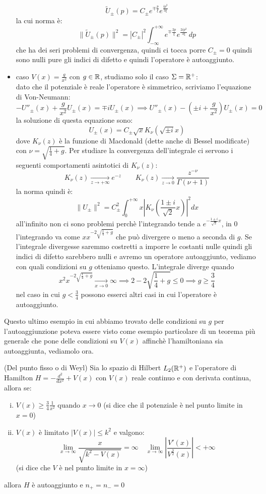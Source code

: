 \begin{itemize}
\[\tilde{U}_\pm(p) = C_\pm e^{\mp\frac{p}{\xi}}e^{\frac{ip^3}{3\xi}}\]
la cui norma è:
\[\|\tilde{U}_\pm(p) \|^2 = |C_\pm|^2\int_{-\infty}^{+\infty} e^{\mp\frac{2p}{\xi}}e^{\frac{2ip^3}{3\xi}}\,dp \]
che ha dei seri problemi di convergenza, quindi ci tocca porre $C_\pm=0$ quindi sono nulli pure gli indici di difetto e quindi l'operatore è autoaggiunto.
\item caso $V(x) = \frac{g}{x^2}$ con $g\in\mathbb{R}$, studiamo solo il caso $\Sigma=\mathbb{R}^+$:\\ \newline
dato che il potenziale è reale l'operatore è simmetrico, scriviamo l'equazione di Von-Neumann:
\[-U''_\pm(x) + \frac{g}{x^2}U_\pm(x) = \mp i U_\pm(x)\implies U''_\pm(x) - \left(\pm i+\frac{g}{x^2}\right)U_\pm(x)=0\]
la soluzione di questa equazione sono:
\[U_\pm(x) = C_\pm\sqrt{x} K_\nu(\sqrt{\pm i}x)\]
dove $K_\nu(z)$ è la funzione di Macdonald (dette anche di Bessel modificate) con $\nu = \sqrt{\frac{1}{4}+g}$. Per studiare la convergenza dell'integrale ci servono i seguenti comportamenti asintotici di $K_\nu(z)$:
\[K_\nu(z)\xrightarrow[z\to +\infty]{} e^{-z} \qquad K_\nu(z)\xrightarrow[z\to 0]{} \frac{z^{-\nu}}{\Gamma(\nu+1)}\]
la norma quindi è:
\[\|U_\pm\|^2 = C_\pm^2\int_0^{+\infty}x\left|K_\nu\left(\frac{1\pm i}{\sqrt{2}}x\right)\right|^2dx\]
all'infinito non ci sono problemi perchè l'integrando tende a $e^{-\frac{1\pm i}{\sqrt{2}}x}$, in 0 l'integrando va come $ x x^{-2\sqrt{\frac{1}{4}+g} }$ che può divergere o meno a seconda di $g$. Se l'integrale divergesse saremmo costretti a imporre le costanti nulle quindi gli indici di difetto sarebbero nulli e avremo un operatore autoaggiunto, vediamo con quali condizioni su $g$ otteniamo questo. L'integrale diverge quando
\[x^2 x^{-2\sqrt{\frac{1}{4}+g}}\xrightarrow[x\to 0]{}\infty \implies 2-2\sqrt{\frac{1}{4}+g}\leq 0 \implies g\geq \frac{3}{4}\]
nel caso in cui $g<\frac{3}{4}$ possono esserci altri casi in cui l'operatore è autoaggiunto.
\end{itemize}
Questo ultimo esempio in cui abbiamo trovato delle condizioni su $g$ per l'autoaggiunzione poteva essere visto come esempio particolare di un teorema più generale che pone delle condizioni su $V(x)$ affinchè l'hamiltoniana sia autoaggiunta, vediamolo ora.
\begin{thm}(Del punto fisso o di Weyl)
Sia lo spazio di Hilbert $L_2(\mathbb{R}^+)$ e l'operatore di Hamilton $H = -\frac{d^2}{dx^2} + V(x)$ con $V(x)$ reale continuo e con derivata continua, allora se:
\begin{enumerate}[i.]
\item $V(x)\geq \frac{3}{4}\frac{1}{x^2}$ quando $x\to 0$ (si dice che il potenziale è nel punto limite in $x=0$)
\item $V(x)$ è limitato $|V(x)|\leq k^2$ e valgono:
\[\lim_{x\to\infty}\frac{x}{\sqrt{k^2-V(x)}} = \infty \quad \lim_{x\to \infty} \left|\frac{V'(x)}{V^{\frac{3}{2}}(x)}\right|<+\infty\]
(si dice che $V$ è nel punto limite in $x=\infty$)
\end{enumerate}
allora $H$ è autoaggiunto e $n_+=n_-=0$
\end{thm}
